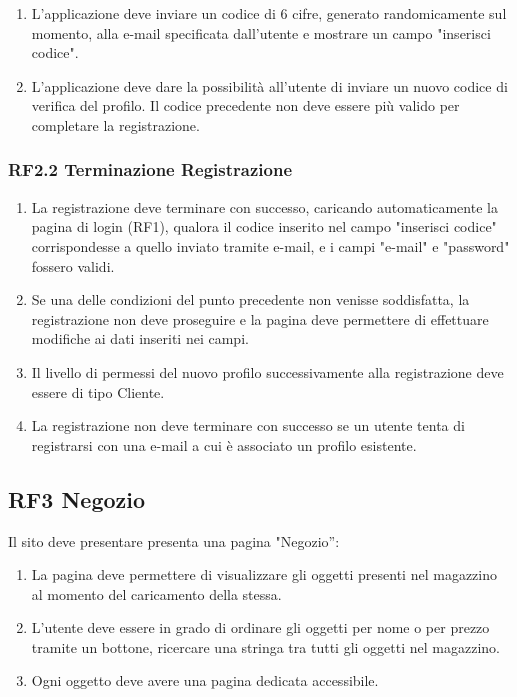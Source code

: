 \documentclass{report}
\begin{document}
\begin{enumerate}
	\item L'applicazione deve inviare un codice di 6 cifre, generato randomicamente sul momento, alla e-mail specificata dall’utente e mostrare un campo "inserisci codice".
		
	\item L'applicazione deve dare la possibilità all’utente di inviare un nuovo codice di verifica del profilo. Il codice precedente non deve essere più valido per completare la registrazione.
		
\end{enumerate}


\subsubsection*{RF2.2 Terminazione Registrazione}
\begin{enumerate}
	\item La registrazione deve terminare con successo, caricando automaticamente la pagina di login (RF1), qualora il codice inserito nel campo "inserisci codice" corrispondesse a quello inviato tramite e-mail, e i campi "e-mail" e "password" fossero validi.
	\item Se una delle condizioni del punto precedente non venisse soddisfatta, la registrazione non deve proseguire e la pagina deve permettere di effettuare modifiche ai dati inseriti nei campi.
	\item Il livello di permessi del nuovo profilo successivamente alla registrazione deve essere di tipo Cliente.
	\item La registrazione non deve terminare con successo se un utente tenta di registrarsi con una e-mail a cui è associato un profilo esistente.

\end{enumerate}


\subsection*{RF3 Negozio}
Il sito deve presentare presenta una pagina "Negozio”: 

\begin{enumerate}
	\item La pagina deve permettere di visualizzare gli oggetti presenti nel magazzino al momento del caricamento della stessa.
	
	\item L’utente deve essere in grado di ordinare gli oggetti per nome o per prezzo tramite un bottone, ricercare una stringa tra tutti gli oggetti nel magazzino.
	
	\item Ogni oggetto deve avere una pagina dedicata accessibile.
\end{enumerate}
\end{document}
